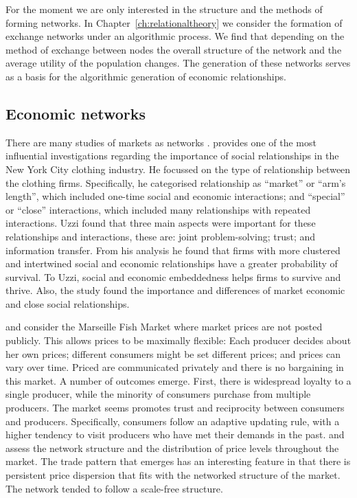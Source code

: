 For the moment we are only interested in the structure and the methods of forming networks. In Chapter~\ref{ch:relationaltheory} we consider the formation of exchange networks under an algorithmic process. We find that depending on the method of exchange between nodes the overall structure of the network and the average utility of the population changes. The generation of these networks serves as a basis for the algorithmic generation of economic relationships.

\subsection{Economic networks}

There are many studies of markets as networks \citep{RauchCasella2001}. \citet{Uzzi1996} provides one of the most influential investigations regarding the importance of social relationships in the New York City clothing industry. He focussed on the type of relationship between the clothing firms. Specifically, he categorised relationship as ``market'' or ``arm's length'', which included one-time social and economic interactions; and ``special'' or ``close'' interactions, which included many relationships with repeated interactions. Uzzi found that three main aspects were important for these relationships and interactions, these are: joint problem-solving; trust; and information transfer. From his analysis he found that firms with more clustered and intertwined social and economic relationships have a greater probability of survival. To Uzzi, social and economic embeddedness helps firms to survive and thrive. Also, the study found the importance and differences of market economic and close social relationships.

\citet{Weisbuch2000} and \citet{KirmanVriend2001} consider the Marseille Fish Market where market prices are not posted publicly. This allows prices to be maximally flexible: Each producer decides about her own prices; different consumers might be set different prices; and prices can vary over time. Priced are communicated privately and there is no bargaining in this market. A number of outcomes emerge. First, there is widespread loyalty to a single producer, while the minority of consumers purchase from multiple producers. The market seems promotes trust and reciprocity between consumers and producers. Specifically, consumers follow an adaptive updating rule, with a higher tendency to visit producers who have met their demands in the past. \citet{Vignes1993} and \citet{VignesEtienne2011} assess the network structure and the distribution of price levels throughout the market. The trade pattern that emerges has an interesting feature in that there is persistent price dispersion that fits with the networked structure of the market. The network tended to follow a scale-free structure.

